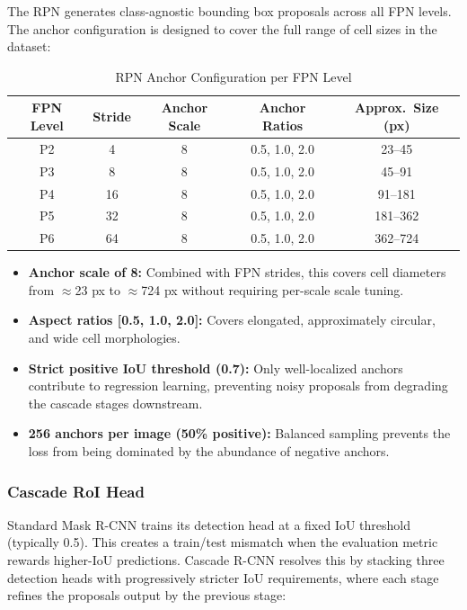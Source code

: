 \documentclass[a4paper]{article} %
\begin{document}
The RPN generates class-agnostic bounding box proposals across all FPN levels. The anchor configuration is designed to cover the full range of cell sizes in the dataset:

\begin{table}[H]
\centering
\caption{RPN Anchor Configuration per FPN Level}
\label{tab:rpn_anchors}
\begin{tabular}{ccccc}
\toprule
\textbf{FPN Level} & \textbf{Stride} & \textbf{Anchor Scale} & \textbf{Anchor Ratios} & \textbf{Approx.\ Size (px)} \\
\midrule
P2 & 4  & 8 & 0.5, 1.0, 2.0 & 23--45   \\
P3 & 8  & 8 & 0.5, 1.0, 2.0 & 45--91   \\
P4 & 16 & 8 & 0.5, 1.0, 2.0 & 91--181  \\
P5 & 32 & 8 & 0.5, 1.0, 2.0 & 181--362 \\
P6 & 64 & 8 & 0.5, 1.0, 2.0 & 362--724 \\
\bottomrule
\end{tabular}
\end{table}

\begin{itemize}
    \item \textbf{Anchor scale of 8:} Combined with FPN strides, this covers cell diameters from $\approx$23 px to $\approx$724 px without requiring per-scale scale tuning.
    \item \textbf{Aspect ratios [0.5, 1.0, 2.0]:} Covers elongated, approximately circular, and wide cell morphologies.
    \item \textbf{Strict positive IoU threshold (0.7):} Only well-localized anchors contribute to regression learning, preventing noisy proposals from degrading the cascade stages downstream.
    \item \textbf{256 anchors per image (50\% positive):} Balanced sampling prevents the loss from being dominated by the abundance of negative anchors.
\end{itemize}

\subsubsection{Cascade RoI Head}

Standard Mask R-CNN trains its detection head at a fixed IoU threshold (typically 0.5). This creates a train/test mismatch when the evaluation metric rewards higher-IoU predictions. Cascade R-CNN resolves this by stacking three detection heads with progressively stricter IoU requirements, where each stage refines the proposals output by the previous stage:
\end{document}
